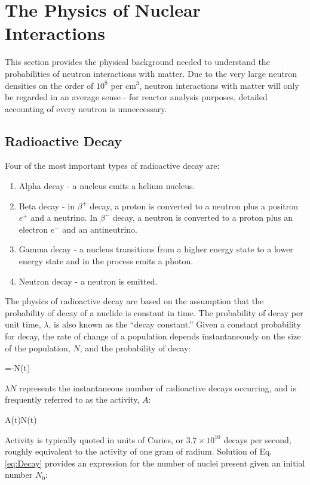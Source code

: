 \section{The Physics of Nuclear Interactions}

This section provides the physical background needed to understand the probabilities of neutron interactions with matter. Due to the very large neutron densities on the order of \(10^8\) per cm$^3$, neutron interactions with matter will only be regarded in an average sense - for reactor analysis purposes, detailed accounting of every neutron is unneccessary. 

\subsection{Radioactive Decay}
\label{sec:RadioactiveDecay}
Four of the most important types of radioactive decay are:

\begin{enumerate}
\item Alpha decay - a nucleus emits a helium nucleus.
\item Beta decay - in \(\beta^+\) decay, a proton is converted to a neutron plus a positron \(e^+\) and a neutrino. In \(\beta^-\) decay, a neutron is converted to a proton plus an electron \(e^-\) and an antineutrino.
\item Gamma decay - a nucleus transitions from a higher energy state to a lower energy state and in the process emits a photon.
\item Neutron decay - a neutron is emitted.
\end{enumerate}

The physics of radioactive decay are based on the assumption that the probability of decay of a nuclide is constant in time. The probability of decay per unit time, \(\lambda\), is also known as the ``decay constant.'' Given a constant probability for decay, the rate of change of a population depends instantaneously on the size of the population, \(N\), and the probability of decay:

\beq
\label{eq:Decay}
=-\lambda N(t)
\eeq

\(\lambda N\) represents the instantaneous number of radioactive decays occurring, and is frequently referred to as the activity, \(A\):

\beq
\label{eq:ActivityDef}
A(t)\equiv\lambda N(t)
\eeq

Activity is typically quoted in units of Curies, or \(3.7\times10^{10}\) decays per second, roughly equivalent to the activity of one gram of radium. Solution of Eq. \eqref{eq:Decay} provides an expression for the number of nuclei present given an initial number \(N_0\):

